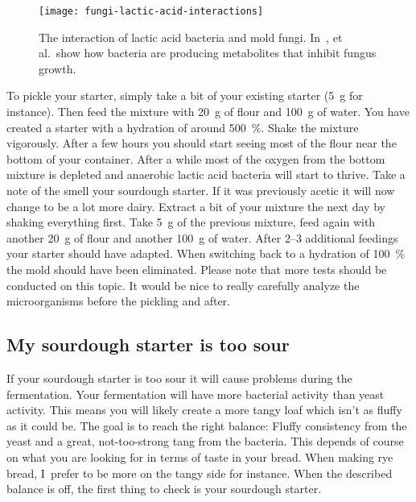 \begin{figure}[!htb]
  \texttt{[image: fungi-lactic-acid-interactions]}
  \caption[The interaction of lactic acid bacteria and mold fungi]{The
      interaction of lactic acid bacteria and mold fungi.
      In~\cite{mold+lactic+acid+bacteria},
      \citeauthor{mold+lactic+acid+bacteria} et al.\ show how bacteria are
      producing metabolites that inhibit fungus growth.}%
  \label{fig:fungi-lactic-acid-interactions}
\end{figure}

To pickle your starter, simply take a bit of your existing starter (\qty{5}{\gram} for
instance). Then feed the mixture with \qty{20}{\gram} of flour and \qty{100}{\gram} of water. You have
created a starter with a hydration of around \qty{500}{\percent}. Shake the mixture vigorously.
After a few hours you should start seeing most of the flour near the bottom
of your container. After a while most of the oxygen from the bottom mixture
is depleted and anaerobic lactic acid bacteria will start to thrive. Take a
note of the smell your sourdough starter. If it was previously acetic
it will now change to be a lot more dairy. Extract a bit of your mixture the
next day by shaking everything first. Take \qty{5}{\gram} of the previous mixture, feed
again with another \qty{20}{\gram} of flour and another \qty{100}{\gram} of water. After 2--3
additional feedings your starter should have adapted. When switching back
to a hydration of \qty{100}{\percent} the mold should have been eliminated. Please note that
more tests should be conducted on this topic. It would be nice to really
carefully analyze the microorganisms before the pickling and after.

\subsection{My sourdough starter is too sour}

If your sourdough starter is too sour it will cause problems during
the fermentation. Your fermentation will have more
bacterial activity than yeast activity. This means
you will likely create a more tangy loaf which isn't
as fluffy as it could be. The goal is to reach the right
balance: Fluffy consistency from the yeast and a great,
not-too-strong tang from the bacteria. This depends
of course on what you are looking for in terms of taste
in your bread. When making rye bread, I~prefer to be more
on the tangy side for instance. When the described balance
is off, the first thing to check is your sourdough starter.

